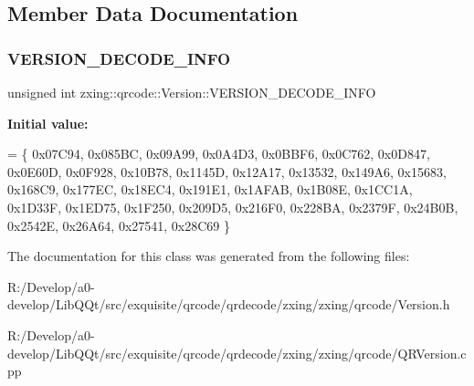 \subsection{Member Data Documentation}
\mbox{\label{classzxing_1_1qrcode_1_1_version_a400c02636eb6f59c6777994935be111e}} 
\subsubsection{\texorpdfstring{V\+E\+R\+S\+I\+O\+N\+\_\+\+D\+E\+C\+O\+D\+E\+\_\+\+I\+N\+FO}{VERSION\_DECODE\_INFO}}
{\footnotesize\ttfamily unsigned int zxing\+::qrcode\+::\+Version\+::\+V\+E\+R\+S\+I\+O\+N\+\_\+\+D\+E\+C\+O\+D\+E\+\_\+\+I\+N\+FO\hspace{0.3cm}{\ttfamily [static]}}

{\bfseries Initial value\+:}
\begin{DoxyCode}
= \{ 0x07C94, 0x085BC, 0x09A99, 0x0A4D3, 0x0BBF6, 0x0C762, 0x0D847, 0x0E60D,
    0x0F928, 0x10B78, 0x1145D, 0x12A17, 0x13532, 0x149A6, 0x15683, 0x168C9, 0x177EC, 0x18EC4, 0x191E1, 
      0x1AFAB,
    0x1B08E, 0x1CC1A, 0x1D33F, 0x1ED75, 0x1F250, 0x209D5, 0x216F0, 0x228BA, 0x2379F, 0x24B0B, 0x2542E, 
      0x26A64,
    0x27541, 0x28C69
                                              \}
\end{DoxyCode}


The documentation for this class was generated from the following files\+:\begin{DoxyCompactItemize}
\item 
R\+:/\+Develop/a0-\/develop/\+Lib\+Q\+Qt/src/exquisite/qrcode/qrdecode/zxing/zxing/qrcode/Version.\+h\item 
R\+:/\+Develop/a0-\/develop/\+Lib\+Q\+Qt/src/exquisite/qrcode/qrdecode/zxing/zxing/qrcode/Q\+R\+Version.\+cpp\end{DoxyCompactItemize}
